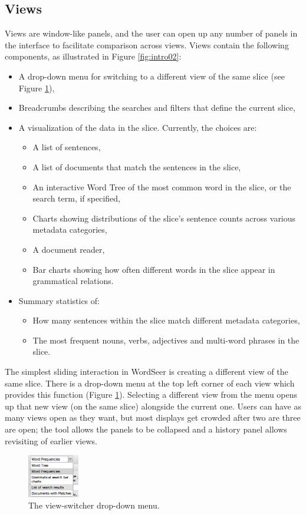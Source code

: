 \documentclass{sig-alternate}
\begin{document}
\subsection{Views}
Views  are window-like panels, and the user can open up any number of panels in the interface to facilitate comparison across views.  Views contain the following components, as illustrated in Figure \ref{fig:intro02}:
\begin{itemize}
	\item A drop-down menu for switching to a different view of the same slice (see Figure \ref{fig:chris03}),
	\item Breadcrumbs describing the searches and filters that define the current slice,
	\item A visualization of the data in the slice. Currently, the choices are:
		\begin{itemize}
			\item A list of sentences,
			\item A list of documents that match the sentences in the slice,
			\item An interactive Word Tree \cite{wattenberg_word_2008} of the most common word in the slice, or the search term, if specified,
			\item Charts showing distributions of the slice's sentence counts across various metadata categories,
			\item A document reader,
			\item Bar charts showing how often different words in the slice  appear in grammatical relations.
		\end{itemize}
	\item Summary statistics of:
		\begin{itemize}
			\item How many sentences within the slice match different metadata categories,
			\item The most frequent nouns, verbs, adjectives and multi-word phrases in the slice.
		\end{itemize}
\end{itemize}

The simplest sliding interaction in WordSeer is creating a different view of the same slice.  There is a drop-down menu at the top left corner of each view which provides this function (Figure \ref{fig:chris03}).  Selecting a different view from the menu opens up that new view (on the same slice) alongside the current one. Users can have as many views open as they want, but most displays get crowded after two are three are open; the tool allows the panels to be collapsed and a history panel allows revisiting of earlier views.  
\begin{figure}[h!]
\includegraphics[width=0.2\textwidth]{fig/chris/03.png}
\caption{ The view-switcher drop-down menu.\label{fig:chris03}}
\end{figure}
\end{document}
